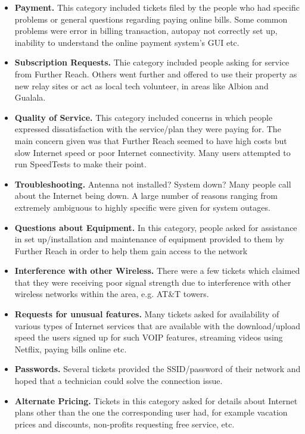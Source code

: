 \begin{itemize}
\item \textbf{Payment.} This category included tickets filed by the people who had specific problems or general questions regarding paying online bills. Some common problems were error in billing transaction, autopay not correctly set up, inability to understand the online payment system’s GUI etc.
\item \textbf{Subscription Requests.} Thie category included people asking for
service from Further Reach. Others
went further and offered to use their property as new relay
  sites or act as local tech volunteer, in areas like Albion and Gualala. %
\item \textbf{Quality of Service.} This category included concerns in which people expressed dissatisfaction with the service/plan they were paying for.
The main concern given was that Further Reach seemed to have high costs but slow Internet speed or poor Internet
connectivity. Many users attempted to run SpeedTests to make their point.
\item \textbf{Troubleshooting.} Antenna not installed? System down? Many people call
  about the Internet being down. A large number of reasons ranging from extremely ambiguous to highly specific were given for system outages.
\item \textbf{Questions about Equipment.} In this category, people asked for assistance in set up/installation and maintenance of equipment provided to them by Further Reach in order to help them gain access to the network
\item \textbf{Interference with other Wireless.} There were a few tickets which claimed
that they were receiving poor signal strength due to interference with other
wireless networks within the area, e.g. AT\&T towers.
\item \textbf{Requests for unusual features.} Many tickets asked for availability of various types of Internet services that are available with the download/upload speed the users signed up for such VOIP features, streaming videos using Netflix, paying bills online etc.
\item \textbf{Passwords.} Several tickets provided the SSID/password of their
network and hoped that a technician could solve the connection issue.
\item \textbf{Alternate Pricing.} Tickets in this category asked for details about
Internet plans other than the one the corresponding user had, for example
vacation prices and discounts, non-profits requesting free service, etc.
\end{itemize}

